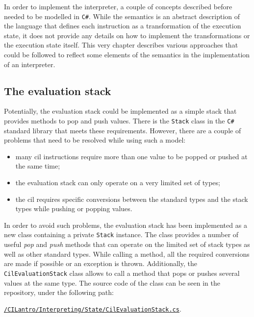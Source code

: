 \documentclass[declaration,shortabstract,english,mgr]{iithesis}
\begin{document}
In order to implement the interpreter, a couple of concepts described before needed to be modelled in \texttt{C\#}. While the semantics is an abstract description of the language that defines each instruction as a transformation of the execution state, it does not provide any details on how to implement the transformations or the execution state itself. This very chapter describes various approaches that could be followed to reflect some elements of the semantics in the implementation of an interpreter.

\subsection{The evaluation stack}

Potentially, the evaluation stack could be implemented as a simple stack that provides methods to pop and push values. There is the \texttt{Stack} class in the \texttt{C\#} standard library that meets these requirements. However, there are a couple of problems that need to be resolved while using such a model:
\begin{itemize}
	\item{many \acrshort{cil} instructions require more than one value to be popped or pushed at the same time;}
	\item{the evaluation stack can only operate on a very limited set of types;}
	\item{the \acrshort{cil} requires specific conversions between the standard types and the stack types while pushing or popping values.}
\end{itemize}

In order to avoid such problems, the evaluation stack has been implemented as a new class containing a private \texttt{Stack} instance. The class provides a number of useful \textit{pop} and \textit{push} methods that can operate on the limited set of stack types as well as other standard types. While calling a method, all the required conversions are made if possible or an exception is thrown. Additionally, the \texttt{CilEvaluationStack} class allows to call a method that pops or pushes several values at the same type. The source code of the class can be seen in the repository, under the following path: 
\begin{center}
\href{https://github.com/kvasnyk/CILantro/blob/master/CILantro/CILantro/Interpreting/State/CilEvaluationStack.cs}{\texttt{/CILantro/Interpreting/State/CilEvaluationStack.cs}}.
\end{center}
\end{document}
